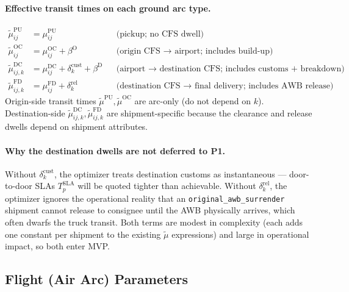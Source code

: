 \documentclass[11pt,a4paper]{article}
\theoremstyle{definition}
\begin{document}
\paragraph{Effective transit times on each ground arc type.}
\begin{align}
  \tilde{\mu}_{ij}^{\text{PU}}  &= \mu_{ij}^{\text{PU}}
                                 & & \text{(pickup; no CFS dwell)} \label{eq:eff-transit-pu} \\
  \tilde{\mu}_{ij}^{\text{OC}}  &= \mu_{ij}^{\text{OC}} + \beta^{\text{O}}
                                 & & \text{(origin CFS $\to$ airport; includes build-up)} \label{eq:eff-transit-oc} \\
  \tilde{\mu}_{ij,k}^{\text{DC}} &= \mu_{ij}^{\text{DC}} + \delta^{\text{cust}}_k + \beta^{\text{D}}
                                 & & \text{(airport $\to$ destination CFS; includes customs + breakdown)} \label{eq:eff-transit-dc} \\
  \tilde{\mu}_{ij,k}^{\text{FD}} &= \mu_{ij}^{\text{FD}} + \delta^{\text{rel}}_k
                                 & & \text{(destination CFS $\to$ final delivery; includes AWB release)} \label{eq:eff-transit-fd}
\end{align}
Origin-side transit times $\tilde{\mu}^{\text{PU}}, \tilde{\mu}^{\text{OC}}$ are arc-only
(do not depend on $k$). Destination-side $\tilde{\mu}^{\text{DC}}_{ij,k}, \tilde{\mu}^{\text{FD}}_{ij,k}$
are shipment-specific because the clearance and release dwells depend on shipment
attributes.

\paragraph{Why the destination dwells are not deferred to P1.}
Without $\delta^{\text{cust}}_k$, the optimizer treats destination customs as
instantaneous --- door-to-door SLAs $T_p^{\text{SLA}}$ will be quoted tighter than
achievable. Without $\delta^{\text{rel}}_k$, the optimizer ignores the operational
reality that an \texttt{original\_awb\_surrender} shipment cannot release to consignee
until the AWB physically arrives, which often dwarfs the truck transit. Both terms are
modest in complexity (each adds one constant per shipment to the existing $\tilde{\mu}$
expressions) and large in operational impact, so both enter MVP.

\subsection{Flight (Air Arc) Parameters}
\label{sec:flight-params}
\end{document}
